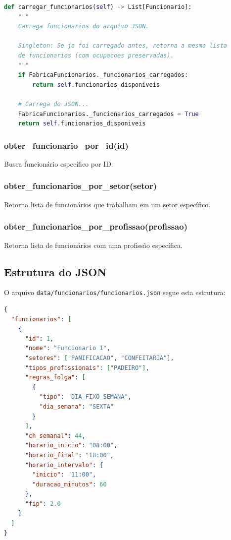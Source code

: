 \documentclass[11pt,a4paper]{article}
\begin{document}
\begin{tcolorbox}[colback=codebg,colframe=headerblue,title=Método carregar\_funcionarios]
\begin{lstlisting}[language=Python]
def carregar_funcionarios(self) -> List[Funcionario]:
    """
    Carrega funcionarios do arquivo JSON.

    Singleton: Se ja foi carregado antes, retorna a mesma lista
    de funcionarios (com ocupacoes preservadas).
    """
    if FabricaFuncionarios._funcionarios_carregados:
        return self.funcionarios_disponiveis

    # Carrega do JSON...
    FabricaFuncionarios._funcionarios_carregados = True
    return self.funcionarios_disponiveis
\end{lstlisting}
\end{tcolorbox}

\subsubsection{obter\_funcionario\_por\_id(id)}

Busca funcionário específico por ID.

\subsubsection{obter\_funcionarios\_por\_setor(setor)}

Retorna lista de funcionários que trabalham em um setor específico.

\subsubsection{obter\_funcionarios\_por\_profissao(profissao)}

Retorna lista de funcionários com uma profissão específica.

\subsection{Estrutura do JSON}

O arquivo \texttt{data/funcionarios/funcionarios.json} segue esta estrutura:

\begin{tcolorbox}[colback=codebg,colframe=headerblue,title=Estrutura JSON]
\begin{lstlisting}[language=JSON]
{
  "funcionarios": [
    {
      "id": 1,
      "nome": "Funcionario 1",
      "setores": ["PANIFICACAO", "CONFEITARIA"],
      "tipos_profissionais": ["PADEIRO"],
      "regras_folga": [
        {
          "tipo": "DIA_FIXO_SEMANA",
          "dia_semana": "SEXTA"
        }
      ],
      "ch_semanal": 44,
      "horario_inicio": "08:00",
      "horario_final": "18:00",
      "horario_intervalo": {
        "inicio": "11:00",
        "duracao_minutos": 60
      },
      "fip": 2.0
    }
  ]
}
\end{lstlisting}
\end{tcolorbox}
\end{document}
